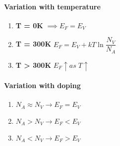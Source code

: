 \documentclass[10pt, a4paper]{report}
\begin{document}
	\paragraph{Variation with temperature}
	\begin{enumerate}
		\item \textbf{T = 0K} $ \implies  E_F = E_V$
		\item \textbf{T = 300K} $ E_F = E_V + kT \ln\dfrac{N_V}{N_A} $
		\item \textbf{T > 300K} $ E_F\uparrow as \; T\uparrow $
	\end{enumerate}
	
	\paragraph{Variation with doping}
	\begin{enumerate}
		\item $ N_A \approx N_V \rightarrow E_F = E_V$
		\item $ N_A > N_V \rightarrow E_F < E_V $
		\item $ N_A < N_V \rightarrow E_F > E_V $
	\end{enumerate}
	
\end{document}
